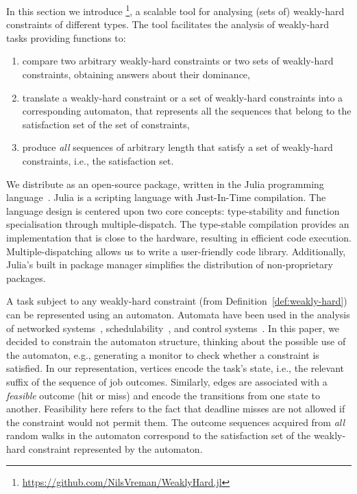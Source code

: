 
In this section we introduce \tool{}\footnote{\url{https://github.com/NilsVreman/WeaklyHard.jl}}, a scalable tool for analysing (sets of) weakly-hard constraints of different types.
The tool facilitates the analysis of weakly-hard tasks providing functions to:
%
\begin{enumerate}[label=(\roman*)]
    \item compare two arbitrary weakly-hard constraints or two sets of weakly-hard constraints, obtaining answers about their dominance,%
    \item translate a weakly-hard constraint or a set of weakly-hard constraints into a corresponding automaton, that represents all the sequences that belong to the satisfaction set of the set of constraints,
    \item produce \emph{all} sequences of arbitrary length that satisfy a set of weakly-hard constraints, i.e., the satisfaction set.
\end{enumerate}
%
We distribute \tool{} as an open-source package, written in the Julia programming language~\cite{Julia:2017}.
Julia is a scripting language with Just-In-Time compilation.
The language design is centered upon two core concepts: type-stability and function specialisation through multiple-dispatch. 
The type-stable compilation provides an implementation that is close to the hardware, resulting in efficient code execution.
Multiple-dispatching allows us to write a user-friendly code library.
Additionally, Julia's built in package manager simplifies the distribution of non-proprietary packages.

A task subject to any weakly-hard constraint (from Definition~\ref{def:weakly-hard}) can be represented using an automaton.
Automata have been used in the analysis of networked systems~\cite{Huang:2019a, Osch:2001}, schedulability~\cite{Zeng:2012, Fersman:2002, Fersman:2007}, and control systems~\cite{Linsenmayer:2017, Linsenmayer:2021, Pazzaglia:2018, Horssen:2016}.
In this paper, we decided to constrain the automaton structure, thinking about the possible use of the automaton, e.g., generating a monitor to check whether a constraint is satisfied.
In our representation, vertices encode the task's state, i.e., the relevant suffix of the sequence of job outcomes.
Similarly, edges are associated with a \emph{feasible} outcome (hit or miss) and encode the transitions from one state to another.
Feasibility here refers to the fact that deadline misses are not allowed if the constraint would not permit them.
The outcome sequences acquired from \emph{all} random walks in the automaton correspond to the satisfaction set of the weakly-hard constraint represented by the automaton.

